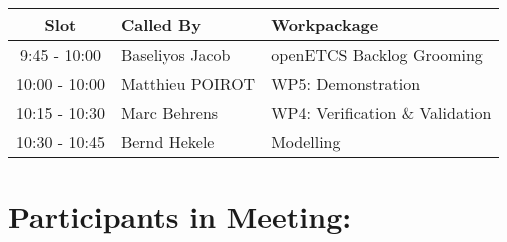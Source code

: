 \documentclass[a4paper, 11pt]{article}
\begin{document}
\begin{tabular}{|c|l|l|}
\hline
\textbf{Slot} &  \textbf{Called By} & \textbf{Workpackage} \\
\hline  
9:45 - 10:00 & Baseliyos Jacob & openETCS Backlog Grooming  \\\hline
10:00 - 10:00 & Matthieu POIROT & WP5: Demonstration \\\hline
10:15 - 10:30 & Marc Behrens & WP4: Verification \& Validation \\\hline 
10:30 - 10:45 & Bernd Hekele & Modelling \\\hline
\end{tabular}

\section{Participants in Meeting:}
\end{document}
